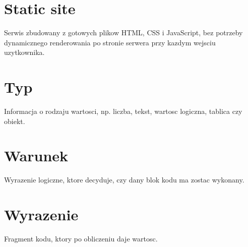 \section*{Static site}
Serwis zbudowany z gotowych plikow HTML, CSS i JavaScript, bez potrzeby dynamicznego
renderowania po stronie serwera przy kazdym wejsciu uzytkownika.

\section*{Typ}
Informacja o rodzaju wartosci, np. liczba, tekst, wartosc logiczna, tablica czy obiekt.

\section*{Warunek}
Wyrazenie logiczne, ktore decyduje, czy dany blok kodu ma zostac wykonany.

\section*{Wyrazenie}
Fragment kodu, ktory po obliczeniu daje wartosc.
